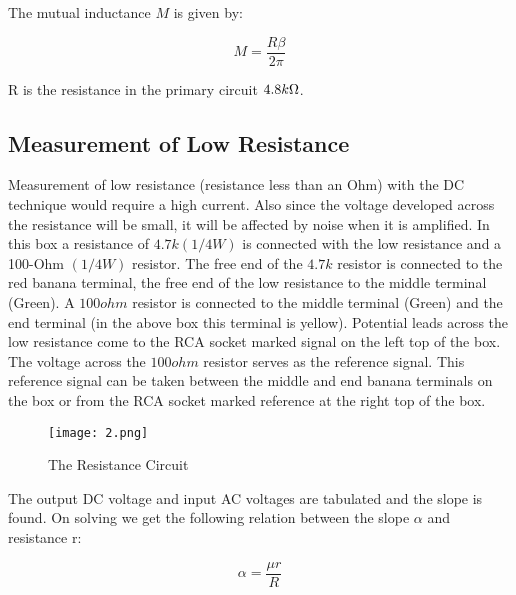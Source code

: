 		The mutual inductance $M$ is given by:

		\begin{equation}
			M = \frac{R\beta}{2\pi}
			\label{eq:1}
		\end{equation}

		R is the resistance in the primary circuit $4.8 k\ohm$.
	
	\subsection{Measurement of Low Resistance}
		Measurement of low resistance (resistance less than an Ohm) with the DC technique would require a high current. Also since the voltage developed across the resistance will be small, it will be affected by noise when it is amplified. In this box a resistance of $4.7 k (1/4 W)$ is connected with the low resistance and a 100-Ohm $(1/4 W)$ resistor. The free end of the $4.7k$ resistor is connected to the red banana terminal, the free end of the low resistance to the middle terminal (Green). A $100ohm$ resistor is connected to the middle terminal (Green) and the end terminal (in the above box this terminal is yellow). Potential leads across the low resistance come to the RCA socket marked signal on the left top of the box. The voltage across the $100ohm$ resistor serves as the reference signal. This reference signal can be taken between the middle and end banana terminals on the box or from the RCA socket marked reference at the right top of the box.
	
		\begin{figure}[H]
			\centering
			\texttt{[image: 2.png]}
			\caption{The Resistance Circuit}
			\label{fig:2}
		\end{figure}

		The output DC voltage and input AC voltages are tabulated and the slope is found. On solving we get the following relation between the slope $\alpha$ and resistance r:

		\begin{equation}
			\alpha = \frac{\mu r}{R}
			\label{eq:2}
		\end{equation}
